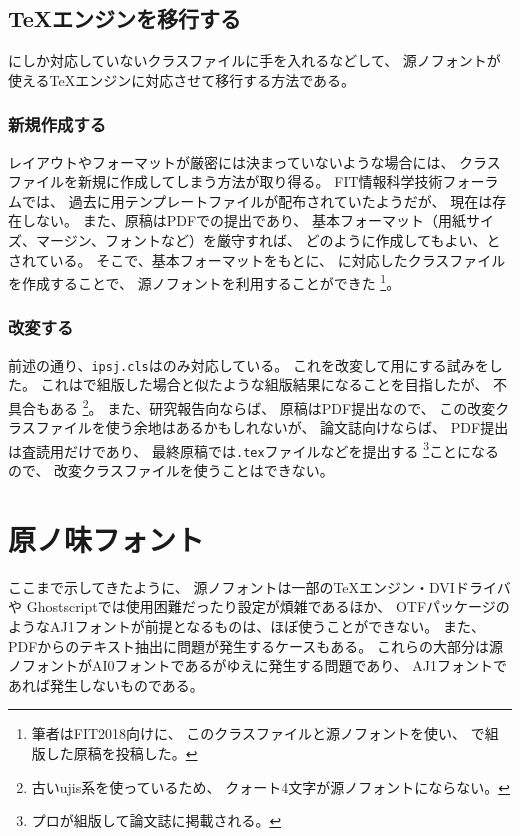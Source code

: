\subsection{\TeX エンジンを移行する}

\pTeX にしか対応していないクラスファイルに手を入れるなどして、
源ノフォントが使える\TeX エンジンに対応させて移行する方法である。

\subsubsection{新規作成する}

レイアウトやフォーマットが厳密には決まっていないような場合には、
クラスファイルを新規に作成してしまう方法が取り得る。
FIT情報科学技術フォーラム\cite{fit2019}では、
過去に\pLaTeX 用テンプレートファイルが配布されていたようだが、
現在は存在しない。
また、原稿はPDFでの提出であり、
基本フォーマット（用紙サイズ、マージン、フォントなど）を厳守すれば、
どのように作成してもよい、とされている。
そこで、基本フォーマットをもとに、
\LuaLaTeX に対応したクラスファイルを作成\cite{FITpaper-class}することで、
源ノフォントを利用することができた
\footnote{筆者はFIT2018向けに、
  このクラスファイルと源ノフォントを使い、
  \LuaLaTeX で組版した原稿を投稿した。}。

\subsubsection{改変する}

前述の通り、\texttt{ipsj.cls}は\pLaTeX のみ対応している。
これを改変して\upLaTeX 用にする試み\cite{up-ipsj.cls}をした。
これは\pLaTeX で組版した場合と似たような組版結果になることを目指したが、
不具合もある
\footnote{古いujis系を使っているため、
  クォート4文字が源ノフォントにならない。}。
また、研究報告向ならば、
原稿はPDF提出なので、
この改変クラスファイルを使う余地はあるかもしれないが、
論文誌向けならば、
PDF提出は査読用だけであり、
最終原稿では\texttt{\textcompwordmark .tex}ファイルなどを提出する
\footnote{プロが組版して論文誌に掲載される。}ことになるので、
改変クラスファイルを使うことはできない。

\section{原ノ味フォント}

ここまで示してきたように、
源ノフォントは一部の\TeX エンジン・DVIドライバや
Ghostscriptでは使用困難だったり設定が煩雑であるほか、
OTFパッケージのようなAJ1フォントが前提となるものは、ほぼ使うことができない。
また、PDFからのテキスト抽出に問題が発生するケースもある。
これらの大部分は源ノフォントがAI0フォントであるがゆえに発生する問題であり、
AJ1フォントであれば発生しないものである。

